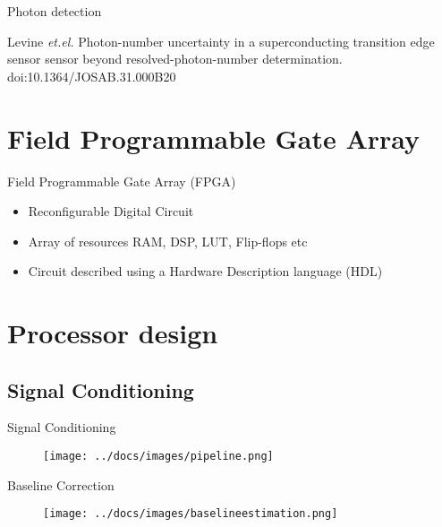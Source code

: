 \documentclass{beamer}
\begin{document}
\begin{frame}{Photon detection}
  \begin{figure}[!hpbt]
    \centering 
    
  \end{figure}
  \vspace{-0.8 cm}
  {\Tiny Levine \emph{et.el.} Photon-number uncertainty in a superconducting 
  transition edge sensor sensor beyond resolved-photon-number determination.  
  doi:10.1364/JOSAB.31.000B20}
\end{frame}
  
\section{Field Programmable Gate Array}
\begin{frame}{Field Programmable Gate Array (FPGA)}
  \begin{itemize}
    \item Reconfigurable Digital Circuit
    \item Array of resources RAM, DSP, LUT, Flip-flops etc
    \item Circuit described using a Hardware Description language (HDL) 
  \end{itemize}
\end{frame}

\section{Processor design}

\subsection{Signal Conditioning}

\begin{frame}{Signal Conditioning}
  \begin{figure}[!hpbt]
    \centering
    \texttt{[image: ../docs/images/pipeline.png]}
  \end{figure}
\end{frame}

\begin{frame}{Baseline Correction}
  \begin{figure}[!hpbt]
    \centering
    \texttt{[image: ../docs/images/baselineestimation.png]}
  \end{figure}
\end{frame}
\end{document}
